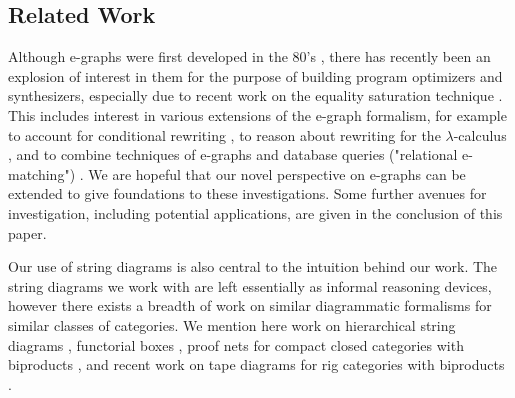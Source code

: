 %

\subsection{Related Work}

Although e-graphs were first developed in the 80's \cite{nelson1980techniques}, there has recently been an explosion of interest in them for the purpose of building program optimizers and synthesizers, especially due to recent work on the equality saturation technique \cite{10.1145/1594834.1480915, griggio_proceedings_2022, EggPaper,flatt_small_2022}.  This includes interest in various extensions of the e-graph formalism, for example to account for conditional rewriting \cite{singher2023colored},  to reason about rewriting for the $\lambda$-calculus \cite{koehler2022sketchguided},  and to combine techniques of e-graphs and database queries ("relational e-matching") \cite{zhang_relational_2022}.  We are hopeful that our novel perspective on e-graphs can be extended to give foundations to these investigations.  Some further avenues for investigation, including potential applications, are given in the conclusion of this paper. 

Our use of string diagrams is also central to the intuition behind our work.  The string diagrams we work with are left essentially as informal reasoning devices, however there exists a breadth of work on similar diagrammatic formalisms for similar classes of categories.  We mention here work on hierarchical string diagrams \cite{ghica_hierarchical_2023},  functorial boxes \cite{mellies_functorial_2006},  proof nets for compact closed categories with biproducts \cite{duncan_generalised_2009}, and recent work on tape diagrams for rig categories with biproducts \cite{bonchi_tape_nodate}. 


